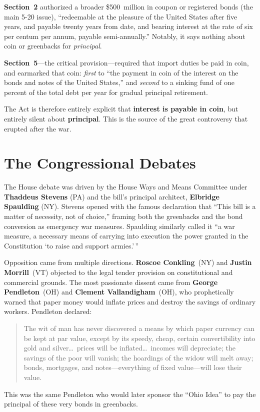 \documentclass[12pt]{article}
\begin{document}
\textbf{Section~2} authorized a broader \$500~million in coupon or
registered bonds (the main 5-20 issue), ``redeemable at the pleasure of
the United States after five years, and payable twenty years from date,
and bearing interest at the rate of six per centum per annum, payable
semi-annually.'' Notably, it says nothing about coin or greenbacks for
\textit{principal}.

\textbf{Section~5}---the critical provision---required that import duties
be paid in coin, and earmarked that coin: \textit{first} to ``the payment
in coin of the interest on the bonds and notes of the United States,'' and
\textit{second} to a sinking fund of one percent of the total debt per
year for gradual principal retirement.

The Act is therefore entirely explicit that \textbf{interest is payable in
coin}, but entirely silent about \textbf{principal}. This is the source
of the great controversy that erupted after the war.

\section{The Congressional Debates}

The House debate was driven by the House Ways and Means Committee under
\textbf{Thaddeus Stevens} (PA) and the bill's principal architect,
\textbf{Elbridge Spaulding} (NY). Stevens opened with the famous
declaration that ``This bill is a matter of necessity, not of choice,''
framing both the greenbacks and the bond conversion as emergency war
measures. Spaulding similarly called it ``a war measure, a necessary means
of carrying into execution the power granted in the Constitution `to raise
and support armies.'\,''

Opposition came from multiple directions. \textbf{Roscoe Conkling}~(NY)
and \textbf{Justin Morrill}~(VT) objected to the legal tender provision on
constitutional and commercial grounds. The most passionate dissent came
from \textbf{George Pendleton}~(OH) and \textbf{Clement
Vallandigham}~(OH), who prophetically warned that paper money would
inflate prices and destroy the savings of ordinary workers. Pendleton
declared:
\begin{quote}
The wit of man has never discovered a means by which paper currency can
be kept at par value, except by its speedy, cheap, certain convertibility
into gold and silver\ldots\ prices will be inflated\ldots\ incomes will
depreciate; the savings of the poor will vanish; the hoardings of the
widow will melt away; bonds, mortgages, and notes---everything of fixed
value---will lose their value.
\end{quote}
This was the same Pendleton who would later sponsor the ``Ohio Idea'' to
pay the principal of these very bonds in greenbacks.
\end{document}
